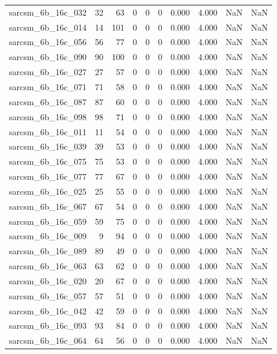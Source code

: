 \documentclass{article}
\begin{document}
\begin{longtable}{lrrrrrrrrr}
sarcsm\_6b\_16c\_032 & 32 & 63 & 0 & 0 & 0 & 0.000 & 4.000 & NaN & NaN \\
sarcsm\_6b\_16c\_014 & 14 & 101 & 0 & 0 & 0 & 0.000 & 4.000 & NaN & NaN \\
sarcsm\_6b\_16c\_056 & 56 & 77 & 0 & 0 & 0 & 0.000 & 4.000 & NaN & NaN \\
sarcsm\_6b\_16c\_090 & 90 & 100 & 0 & 0 & 0 & 0.000 & 4.000 & NaN & NaN \\
sarcsm\_6b\_16c\_027 & 27 & 57 & 0 & 0 & 0 & 0.000 & 4.000 & NaN & NaN \\
sarcsm\_6b\_16c\_071 & 71 & 58 & 0 & 0 & 0 & 0.000 & 4.000 & NaN & NaN \\
sarcsm\_6b\_16c\_087 & 87 & 60 & 0 & 0 & 0 & 0.000 & 4.000 & NaN & NaN \\
sarcsm\_6b\_16c\_098 & 98 & 71 & 0 & 0 & 0 & 0.000 & 4.000 & NaN & NaN \\
sarcsm\_6b\_16c\_011 & 11 & 54 & 0 & 0 & 0 & 0.000 & 4.000 & NaN & NaN \\
sarcsm\_6b\_16c\_039 & 39 & 53 & 0 & 0 & 0 & 0.000 & 4.000 & NaN & NaN \\
sarcsm\_6b\_16c\_075 & 75 & 53 & 0 & 0 & 0 & 0.000 & 4.000 & NaN & NaN \\
sarcsm\_6b\_16c\_077 & 77 & 67 & 0 & 0 & 0 & 0.000 & 4.000 & NaN & NaN \\
sarcsm\_6b\_16c\_025 & 25 & 55 & 0 & 0 & 0 & 0.000 & 4.000 & NaN & NaN \\
sarcsm\_6b\_16c\_067 & 67 & 54 & 0 & 0 & 0 & 0.000 & 4.000 & NaN & NaN \\
sarcsm\_6b\_16c\_059 & 59 & 75 & 0 & 0 & 0 & 0.000 & 4.000 & NaN & NaN \\
sarcsm\_6b\_16c\_009 & 9 & 94 & 0 & 0 & 0 & 0.000 & 4.000 & NaN & NaN \\
sarcsm\_6b\_16c\_089 & 89 & 49 & 0 & 0 & 0 & 0.000 & 4.000 & NaN & NaN \\
sarcsm\_6b\_16c\_063 & 63 & 62 & 0 & 0 & 0 & 0.000 & 4.000 & NaN & NaN \\
sarcsm\_6b\_16c\_020 & 20 & 67 & 0 & 0 & 0 & 0.000 & 4.000 & NaN & NaN \\
sarcsm\_6b\_16c\_057 & 57 & 51 & 0 & 0 & 0 & 0.000 & 4.000 & NaN & NaN \\
sarcsm\_6b\_16c\_042 & 42 & 59 & 0 & 0 & 0 & 0.000 & 4.000 & NaN & NaN \\
sarcsm\_6b\_16c\_093 & 93 & 84 & 0 & 0 & 0 & 0.000 & 4.000 & NaN & NaN \\
sarcsm\_6b\_16c\_064 & 64 & 56 & 0 & 0 & 0 & 0.000 & 4.000 & NaN & NaN \\

\end{longtable}
\end{document}
